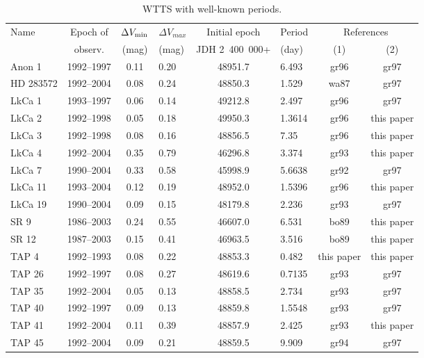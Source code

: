\begin{table}%
\caption{WTTS with well-known periods.}\label{tab3}
\small%
 {
\begin{tabular}{lcclclcc}
\hline \hline
Name & Epoch of & $\Delta V_{\rm min}$ & $\Delta V_{max}$ & Initial epoch & Period &
\multicolumn{2}{c}{References}\\
     &   observ.  & (mag)            & (mag)            & JDH 2~400~000+  & (day)  & (1) & (2) \\
\hline
         Anon 1 &  1992--1997 & 0.11 & 0.20 & 48951.7 &  6.493   & gr96 & gr97 \\
      HD 283572 &  1992--2004 & 0.08 & 0.24 & 48850.3 &  1.529   & wa87 & gr97 \\
         LkCa 1 &  1993--1997 & 0.06 & 0.14 & 49212.8 &  2.497   & gr96 & gr97 \\
         LkCa 2 &  1992--1998 & 0.05 & 0.18 & 49950.3 &  1.3614  & gr96 & this paper \\
         LkCa 3 &  1992--1998 & 0.08 & 0.16 & 48856.5 &  7.35    & gr96 & this paper \\
         LkCa 4 &  1992--2004 & 0.35 & 0.79 & 46296.8 &  3.374   & gr93 & this paper \\
         LkCa 7 &  1990--2004 & 0.33 & 0.58 & 45998.9 &  5.6638  & gr92 & gr97 \\
        LkCa 11 &  1993--2004 & 0.12 & 0.19 & 48952.0 &  1.5396  & gr96 & this paper \\
        LkCa 19 &  1990--2004 & 0.09 & 0.15 & 48179.8 &  2.236   & gr93 & gr97 \\
           SR 9 &  1986--2003 & 0.24 & 0.55 & 46607.0 &  6.531   & bo89 & this paper \\
          SR 12 &  1987--2003 & 0.15 & 0.41 & 46963.5 &  3.516   & bo89 & this paper \\
          TAP 4 &  1992--1993 & 0.08 & 0.22 & 48853.3 &  0.482   & this paper & this paper \\
         TAP 26 &  1992--1997 & 0.08 & 0.27 & 48619.6 &  0.7135  & gr93 & gr97 \\
         TAP 35 &  1992--2004 & 0.05 & 0.13 & 48858.5 &  2.734   & gr93 & gr97 \\
         TAP 40 &  1992--1997 & 0.09 & 0.13 & 48859.8 &  1.5548  & gr93 & gr97 \\
         TAP 41 &  1992--2004 & 0.11 & 0.39 & 48857.9 &  2.425   & gr93 & this paper \\
         TAP 45 &  1992--2004 & 0.09 & 0.21 & 48859.5 &  9.909   & gr94 & gr97 \\

\end{tabular}}
\end{table}
